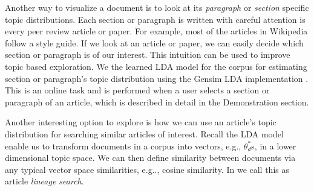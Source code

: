 Another way to visualize a document is to look at its 
\textsl{paragraph} or \textsl{section} specific topic distributions. 
Each section or paragraph is written with careful attention is every 
peer review article or paper. For example, most of the articles in 
Wikipedia follow a style guide. If we look at an article or paper,  
we can easily decide which section or paragraph is of our interest. 
This intuition can be used to improve topic based exploration. We 
the learned LDA model for the corpus for estimating section or 
paragraph's topic distribution using the Gensim LDA implementation 
\cite{rehurek_lrec}. This is an online task and is performed when a 
user selects a section or paragraph of an article, which is 
described in detail in the \system Demonstration section.  


Another interesting option to explore is how we can use an article's 
topic distribution for searching similar articles of interest. 
Recall the LDA model enable us to transform documents in a 
corpus into vectors, e.g., $\theta^*_{d}$s, in a lower dimensional 
topic space. We can then define similarity between documents via any 
typical vector space similarities, e.g.., cosine similarity. In 
\system we call this as article \textsl{lineage search}.         

